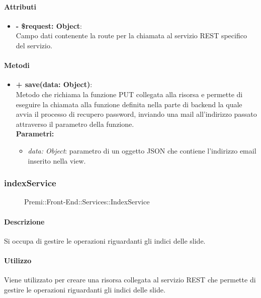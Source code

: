 	\paragraph{Attributi}
	\begin{itemize}
		\item \textbf{- \$request: Object}:\\
		Campo dati contenente la route per la chiamata al servizio REST specifico del servizio.
	\end{itemize}	
	
	\paragraph{Metodi}
	\begin{itemize}
		\item \textbf{+ save(data: Object)}:\\
		Metodo che richiama la funzione PUT collegata alla risorsa e permette di eseguire la chiamata alla funzione definita nella parte di backend la quale avvia il processo di recupero password, inviando una mail all'indirizzo passato attraverso il parametro della funzione.\\
		\textbf{Parametri:}\\
		\begin{itemize}
			\item \textit{data: Object}: parametro di un oggetto JSON che contiene l'indirizzo email inserito nella view.
		\end{itemize}
	\end{itemize}
	
	
\subsubsection{indexService}
	\begin{figure}[h]
		\centering
		\caption[Premi::Front-End::Services::IndexService]{Premi::Front-End::Services::IndexService}
	\end{figure}
	
	\paragraph{Descrizione}
	Si occupa di gestire le operazioni riguardanti gli indici delle slide.
	
	\paragraph{Utilizzo}
	Viene utilizzato per creare una risorsa collegata al servizio REST che permette di gestire le operazioni riguardanti gli indici delle slide.
	
